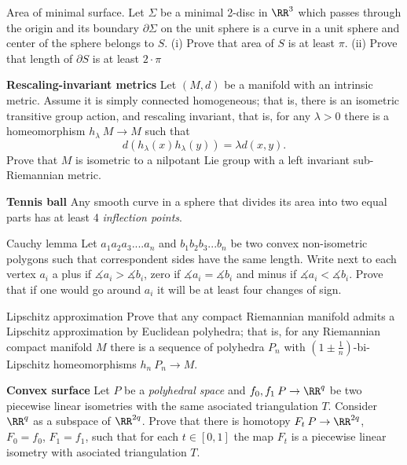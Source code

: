 \begin{pr}{}{Area of minimal surface.} Let $\Sigma$ be a minimal 2-disc in $\RR^3$ which passes through the origin and its boundary $\partial\Sigma$ on the unit sphere is a curve in a unit sphere and center of the sphere belongs to $S$.
(i) Prove that area of $S$ is at least $\pi$.
(ii) Prove that length of $\partial S$ is at least $2\cdot\pi$
\end{pr}

\begin{pr}
{\bf  Rescaling-invariant metrics} Let $(M,d)$ be a manifold with an intrinsic metric. 
Assume it is simply connected homogeneous; 
that is, there is an isometric transitive group action, and rescaling invariant, 
that is, for any $\lambda>0$ there is a homeomorphism $h_\lambda\:M\to M$ such that $$d(h_\lambda(x)h_\lambda(y))=\lambda d(x,y).$$
Prove that $M$ is isometric to a nilpotant Lie group with a left invariant sub-Riemannian metric.
\end{pr}

\begin{pr}
{\bf  Tennis ball} \cite{arnold}\cite{angenent} Any smooth curve in a sphere that divides its area into two equal parts has at least 4 {\it inflection points}.
\end{pr}

\begin{pr}{\easy}{Cauchy lemma} Let $a_1a_2a_3....a_n$ and $b_1b_2b_3...b_n$ be two convex non-isometric polygons such that correspondent sides have the same length.
Write next to each vertex $a_i$  a plus if $\measuredangle a_i>\measuredangle b_i$, zero if  $\measuredangle a_i=\measuredangle b_i$ and minus if $\measuredangle a_i<\measuredangle b_i$.
Prove that if one would go around $a_i$ it will be at least four changes of sign.
\end{pr}

\begin{pr}{}{Lipschitz approximation}
Prove that any compact Riemannian manifold admits a Lipschitz approximation by Euclidean polyhedra; 
that is, for any Riemannian compact manifold $M$ there is a sequence of polyhedra $P_n$ with $(1\pm\tfrac1n)$-bi-Lipschitz homeomorphisms $h_n\:P_n\to M$.
\end{pr}

\begin{pr}{}
{\bf  Convex surface}
Let $P$ be a \emph{polyhedral space} and $f_0,f_1\:P\to \RR^q$ be two piecewise linear isometries with the same asociated triangulation $T$.
Consider $\RR^q$ as a subspace of $\RR^{2q}$.
Prove that there is homotopy $F_t\:P\to\RR^{2q}$, $F_0=f_0$, $F_1=f_1$, such that for each $t\in[0,1]$ the map $F_t$ is a piecewise linear isometry with asociated triangulation $T$.
\end{pr}

